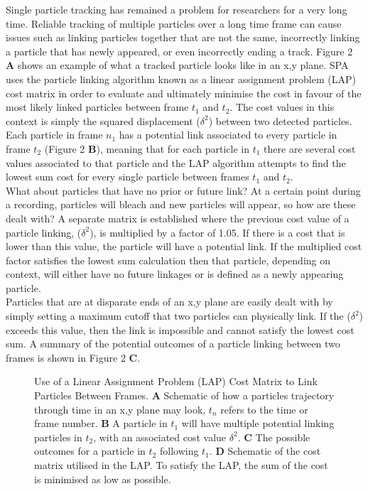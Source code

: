 \documentclass[11pt]{article} %
\begin{document}
Single particle tracking has remained a problem for researchers for a very long time. Reliable tracking of multiple particles over a long time frame can cause issues such as linking particles together that are not the same, incorrectly linking a particle that has newly appeared, or even incorrectly ending a track. Figure 2 \textbf{A} shows an example of what a tracked particle looks like in an x,y plane. SPA uses the particle linking algorithm known as a linear assignment problem (LAP) cost matrix in order to evaluate and ultimately minimise the cost in favour of the most likely linked particles between frame  $t_1$ and $t_2$. The cost values in this context is simply the squared displacement ($\delta^2$) between two detected particles. Each particle in frame $n_1$ has a potential link associated to every particle in frame $t_2$ (Figure 2 \textbf{B}), meaning that for each particle in $t_1$ there are several cost values associated to that particle and the LAP algorithm attempts to find the lowest sum cost for every single particle between frames $t_1$ and $t_2$. \\

What about particles that have no prior or future link? At a certain point during a recording, particles will bleach and new particles will appear, so how are these dealt with? A separate matrix is established where the previous cost value of a particle linking, ($\delta^2$), is multiplied by a factor of 1.05. If there is a cost that is lower than this value, the particle will have a potential link. If the multiplied cost factor satisfies the lowest sum calculation then that particle, depending on context, will either have no future linkages or is defined as a newly appearing particle. \\

Particles that are at disparate ends of an x,y plane are easily dealt with by simply setting a maximum cutoff that two particles can physically link. If the ($\delta^2$) exceeds this value, then the link is impossible and cannot satisfy the lowest cost sum. A summary of the potential outcomes of a particle linking between two frames is shown in Figure 2 \textbf{C}.

	\begin{figure}[H]
	\caption{Use of a Linear Assignment Problem (LAP) Cost Matrix to Link Particles Between Frames. \textbf{A} Schematic of how a particles trajectory through 		time in an x,y plane may look, $t_n$ refers to the time or frame number. \textbf{B} A particle in $t_1$ will have multiple potential linking particles in $t_2$, 			with an associated cost value $\delta^2$. \textbf{C} The possible outcomes for a particle in $t_2$ following $t_1$. \textbf{D} Schematic of the cost matrix 			utilised in the LAP. To satisfy the LAP, the sum of the cost is minimised as low as possible.}
	\end{figure}
\end{document}
